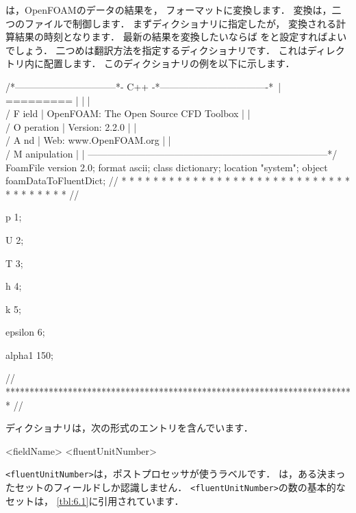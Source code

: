 は，OpenFOAMのデータの結果を，
フォーマットに変換します．
変換は，二つのファイルで制御します．
まずディクショナリに指定したが，
変換される計算結果の時刻となります．
最新の結果を変換したいならば
をと設定すればよいでしょう．
二つめは翻訳方法を指定するディクショナリです．
これはディレクトリ内に配置します．
このディクショナリの例を以下に示します．
\begin{OFverbatim}
/*--------------------------------*- C++ -*----------------------------------*\
| =========                 |                                                 |
| \\      /  F ield         | OpenFOAM: The Open Source CFD Toolbox           |
|  \\    /   O peration     | Version:  2.2.0                                 |
|   \\  /    A nd           | Web:      www.OpenFOAM.org                      |
|    \\/     M anipulation  |                                                 |
\*---------------------------------------------------------------------------*/
FoamFile
{
    version    2.0;
    format     ascii;
    class      dictionary;
    location   "system";
    object     foamDataToFluentDict;
}
// * * * * * * * * * * * * * * * * * * * * * * * * * * * * * * * * * * * * * //

p               1;

U               2;

T               3;

h               4;

k               5;

epsilon         6;

alpha1        150;


// ************************************************************************* //
\end{OFverbatim}
ディクショナリは，次の形式のエントリを含んでいます．
\begin{OFverbatim}[file]
<fieldName> <fluentUnitNumber>
\end{OFverbatim}
\verb|<fluentUnitNumber>|は，ポストプロセッサが使うラベルです．
\OFthirdparty{Fluent}は，ある決まったセットのフィールドしか認識しません．
\verb|<fluentUnitNumber>|の数の基本的なセットは，
\autoref{tbl:6.1}に引用されています．


